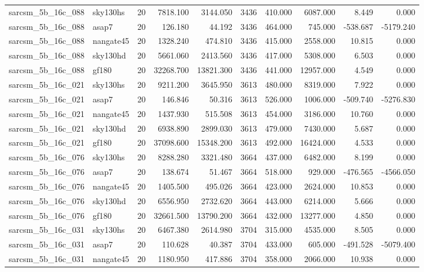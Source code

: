 \begin{tabular}{llrrrrrrrr}
sarcsm\_5b\_16c\_088 & sky130hs & 20 & 7818.100 & 3144.050 & 3436 & 410.000 & 6087.000 & 8.449 & 0.000 \\
sarcsm\_5b\_16c\_088 & asap7 & 20 & 126.180 & 44.192 & 3436 & 464.000 & 745.000 & -538.687 & -5179.240 \\
sarcsm\_5b\_16c\_088 & nangate45 & 20 & 1328.240 & 474.810 & 3436 & 415.000 & 2558.000 & 10.815 & 0.000 \\
sarcsm\_5b\_16c\_088 & sky130hd & 20 & 5661.060 & 2413.560 & 3436 & 417.000 & 5308.000 & 6.503 & 0.000 \\
sarcsm\_5b\_16c\_088 & gf180 & 20 & 32268.700 & 13821.300 & 3436 & 441.000 & 12957.000 & 4.549 & 0.000 \\
sarcsm\_5b\_16c\_021 & sky130hs & 20 & 9211.200 & 3645.950 & 3613 & 480.000 & 8319.000 & 7.922 & 0.000 \\
sarcsm\_5b\_16c\_021 & asap7 & 20 & 146.846 & 50.316 & 3613 & 526.000 & 1006.000 & -509.740 & -5276.830 \\
sarcsm\_5b\_16c\_021 & nangate45 & 20 & 1437.930 & 515.508 & 3613 & 454.000 & 3186.000 & 10.760 & 0.000 \\
sarcsm\_5b\_16c\_021 & sky130hd & 20 & 6938.890 & 2899.030 & 3613 & 479.000 & 7430.000 & 5.687 & 0.000 \\
sarcsm\_5b\_16c\_021 & gf180 & 20 & 37098.600 & 15348.200 & 3613 & 492.000 & 16424.000 & 4.533 & 0.000 \\
sarcsm\_5b\_16c\_076 & sky130hs & 20 & 8288.280 & 3321.480 & 3664 & 437.000 & 6482.000 & 8.199 & 0.000 \\
sarcsm\_5b\_16c\_076 & asap7 & 20 & 138.674 & 51.467 & 3664 & 518.000 & 929.000 & -476.565 & -4566.050 \\
sarcsm\_5b\_16c\_076 & nangate45 & 20 & 1405.500 & 495.026 & 3664 & 423.000 & 2624.000 & 10.853 & 0.000 \\
sarcsm\_5b\_16c\_076 & sky130hd & 20 & 6556.950 & 2732.620 & 3664 & 443.000 & 6214.000 & 5.666 & 0.000 \\
sarcsm\_5b\_16c\_076 & gf180 & 20 & 32661.500 & 13790.200 & 3664 & 432.000 & 13277.000 & 4.850 & 0.000 \\
sarcsm\_5b\_16c\_031 & sky130hs & 20 & 6467.380 & 2614.980 & 3704 & 315.000 & 4535.000 & 8.505 & 0.000 \\
sarcsm\_5b\_16c\_031 & asap7 & 20 & 110.628 & 40.387 & 3704 & 433.000 & 605.000 & -491.528 & -5079.400 \\
sarcsm\_5b\_16c\_031 & nangate45 & 20 & 1180.950 & 417.886 & 3704 & 358.000 & 2066.000 & 10.938 & 0.000 \\

\end{tabular}
